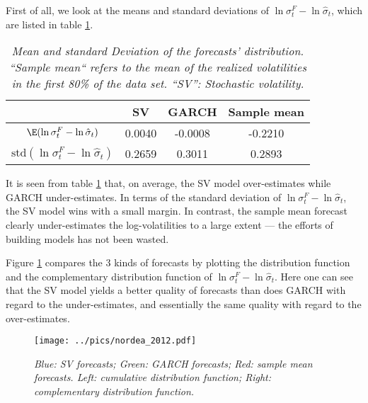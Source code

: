 First of all, we look at the means and standard deviations of $\ln \sigma^F_t -
\ln \hat{\sigma}_t$, which are listed in table \ref{tab:nordea_2012}.
\begin{table}[htb!]
  \centering
  \begin{tabular}{|c|c|c|c|}
    \hline
    & SV & GARCH & Sample mean \\
    \hline
    $\E(\ln \sigma^F_t - \ln \hat{\sigma}_t)$ & 0.0040 & -0.0008 &
    -0.2210 \\
    \hline
    $\text{std}(\ln \sigma^F_t - \ln \hat{\sigma}_t)$ & 0.2659 & 0.3011 &
    0.2893 \\
    \hline
  \end{tabular}
  \caption{\small \it Mean and standard Deviation of the forecasts'
    distribution. ``Sample mean`` refers to the mean of the realized
    volatilities in the first 80\% of the data set. ``SV'': Stochastic
    volatility.}
  \label{tab:nordea_2012}
\end{table}
It is seen from table \ref{tab:nordea_2012} that, on average, the SV
model over-estimates while GARCH under-estimates. In terms of the
standard deviation of $\ln \sigma^F_t - \ln \hat{\sigma}_t$, the SV
model wins with a small margin. In contrast, the sample mean forecast
clearly under-estimates the log-volatilities to a large extent --- the
efforts of building models has not been wasted.

Figure \ref{fig:nordea_2012} compares the 3 kinds of forecasts by
plotting the distribution function and the complementary distribution
function of $\ln \sigma^F_t - \ln \hat{\sigma}_t$. Here one can see
that the SV model yields a better quality of forecasts than does GARCH 
with regard to the under-estimates, and essentially the same quality
with regard to the over-estimates.

\begin{figure}[htb!]
  \centering
    \texttt{[image: ../pics/nordea\_2012.pdf]}
  \caption{\small \it Blue: SV forecasts; Green: GARCH forecasts; Red:
    sample mean forecasts. Left: cumulative distribution function;
    Right: complementary distribution function.}
  \label{fig:nordea_2012}
\end{figure}

